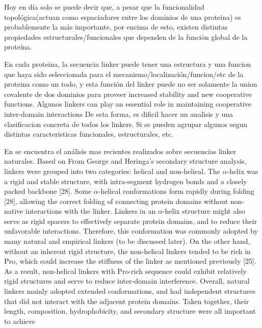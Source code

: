 
Hoy en día solo se puede decir que, a pesar que la funcionalidad topológica(actuan como espaciadores entre los dominios de una proteina) es probablemente la más importante,
por encima de esto, existen distintas propiedades estructurales/funcionales que dependen de la función global de la proteína.

En cada proteina, la secuencia linker puede tener una estructura y una funcion que haya sido seleccionada para el mecanismo/localización/funcion/etc de la proteina como un todo, 
y esta función del linker puede no ser solamente la union covalente de dos dominios para proveer increased stability and new cooperative functions.
Algunos linkers can play an essential role in maintaining cooperative inter-domain interactions
De esta forma, es dificil hacer un analisis y una clasificacion concreta de todos los linkers. Si se pueden agrupar algunos segun distintas caracteristicas funcionales, estructurales, etc.






En \cite{george2002analysis} se encuentra el análisis mas recientes realizados sobre secuencias linker naturales.
Based on From George and
Heringa’s secondary structure analysis, linkers were grouped into two categories: helical and
non-helical. The $\alpha$-helix was a rigid and stable structure, with intra-segment hydrogen bonds
and a closely packed backbone [28]. Some $\alpha$-helical conformations form rapidly during
folding [28], allowing the correct folding of connecting protein domains without non-native
interactions with the linker. Linkers in an $\alpha$-helix structure might also serve as rigid spacers
to effectively separate protein domains, and to reduce their unfavorable interactions.
Therefore, this conformation was commonly adopted by many natural and empirical linkers
(to be discussed later). On the other hand, without an inherent rigid structure, the non-helical
linkers tended to be rich in Pro, which could increase the stiffness of the linker as mentioned
previously [25]. As a result, non-helical linkers with Pro-rich sequence could exhibit
relatively rigid structures and serve to reduce inter-domain interference.
Overall, natural linkers mainly adopted extended conformations, and had independent
structures that did not interact with the adjacent protein domains. Taken together, their
length, composition, hydrophobicity, and secondary structure were all important to achieve




